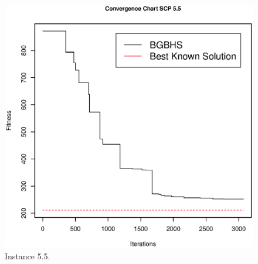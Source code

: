 \begin{figure}[]
\centering
\includegraphics[scale=.45]{Resultados/scp55.eps}
\caption{Instance 5.5.}
\label{fig:Instance.5.5}
\end{figure}

